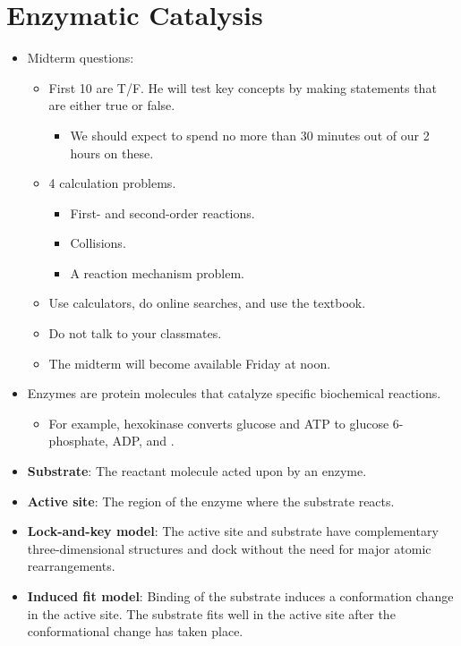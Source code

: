 \documentclass[../notes.tex]{subfiles}
\begin{document}
\section{Enzymatic Catalysis}
\begin{itemize}
    \item {}Midterm questions:
    \begin{itemize}
        \item First 10 are T/F. He will test key concepts by making statements that are either true or false.
        \begin{itemize}
            \item We should expect to spend no more than 30 minutes out of our 2 hours on these.
        \end{itemize}
        \item 4 calculation problems.
        \begin{itemize}
            \item First- and second-order reactions.
            \item Collisions.
            \item A reaction mechanism problem.
        \end{itemize}
        \item Use calculators, do online searches, and use the textbook.
        \item Do not talk to your classmates.
        \item The midterm will become available Friday at noon.
    \end{itemize}
    \item Enzymes are protein molecules that catalyze specific biochemical reactions.
    \begin{itemize}
        \item For example, hexokinase converts glucose and ATP to glucose 6-phosphate, ADP, and .
    \end{itemize}
    \item \textbf{Substrate}: The reactant molecule acted upon by an enzyme.
    \item \textbf{Active site}: The region of the enzyme where the substrate reacts.
    \item \textbf{Lock-and-key model}: The active site and substrate have complementary three-dimensional structures and dock without the need for major atomic rearrangements.
    \item \textbf{Induced fit model}: Binding of the substrate induces a conformation change in the active site. The substrate fits well in the active site after the conformational change has taken place.

\end{itemize}
\end{document}
